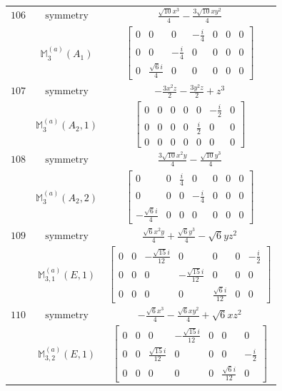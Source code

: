 \documentclass[fleqn,8pt,landscape]{jsarticle}
\begin{document}
\begin{longtable}{ccc}
$ 106 $ & $ \text{symmetry} $ & $ \frac{\sqrt{10} x^{3}}{4} - \frac{3 \sqrt{10} x y^{2}}{4} $ \\
$  $ & $ \mathbb{M}_{3}^{(a)}(A_{1}) $ & $ \begin{bmatrix} 0 & 0 & 0 & - \frac{i}{4} & 0 & 0 & 0 \\ 0 & 0 & - \frac{i}{4} & 0 & 0 & 0 & 0 \\ 0 & \frac{\sqrt{6} i}{4} & 0 & 0 & 0 & 0 & 0 \end{bmatrix} $ \\ \hline
$ 107 $ & $ \text{symmetry} $ & $ - \frac{3 x^{2} z}{2} - \frac{3 y^{2} z}{2} + z^{3} $ \\
$  $ & $ \mathbb{M}_{3}^{(a)}(A_{2},1) $ & $ \begin{bmatrix} 0 & 0 & 0 & 0 & 0 & - \frac{i}{2} & 0 \\ 0 & 0 & 0 & 0 & \frac{i}{2} & 0 & 0 \\ 0 & 0 & 0 & 0 & 0 & 0 & 0 \end{bmatrix} $ \\ \hline
$ 108 $ & $ \text{symmetry} $ & $ \frac{3 \sqrt{10} x^{2} y}{4} - \frac{\sqrt{10} y^{3}}{4} $ \\
$  $ & $ \mathbb{M}_{3}^{(a)}(A_{2},2) $ & $ \begin{bmatrix} 0 & 0 & \frac{i}{4} & 0 & 0 & 0 & 0 \\ 0 & 0 & 0 & - \frac{i}{4} & 0 & 0 & 0 \\ - \frac{\sqrt{6} i}{4} & 0 & 0 & 0 & 0 & 0 & 0 \end{bmatrix} $ \\ \hline
$ 109 $ & $ \text{symmetry} $ & $ \frac{\sqrt{6} x^{2} y}{4} + \frac{\sqrt{6} y^{3}}{4} - \sqrt{6} y z^{2} $ \\
$  $ & $ \mathbb{M}_{3,1}^{(a)}(E,1) $ & $ \begin{bmatrix} 0 & 0 & - \frac{\sqrt{15} i}{12} & 0 & 0 & 0 & - \frac{i}{2} \\ 0 & 0 & 0 & - \frac{\sqrt{15} i}{12} & 0 & 0 & 0 \\ 0 & 0 & 0 & 0 & \frac{\sqrt{6} i}{12} & 0 & 0 \end{bmatrix} $ \\ \hline
$ 110 $ & $ \text{symmetry} $ & $ - \frac{\sqrt{6} x^{3}}{4} - \frac{\sqrt{6} x y^{2}}{4} + \sqrt{6} x z^{2} $ \\
$  $ & $ \mathbb{M}_{3,2}^{(a)}(E,1) $ & $ \begin{bmatrix} 0 & 0 & 0 & - \frac{\sqrt{15} i}{12} & 0 & 0 & 0 \\ 0 & 0 & \frac{\sqrt{15} i}{12} & 0 & 0 & 0 & - \frac{i}{2} \\ 0 & 0 & 0 & 0 & 0 & \frac{\sqrt{6} i}{12} & 0 \end{bmatrix} $ \\ \hline

\end{longtable}
\end{document}
